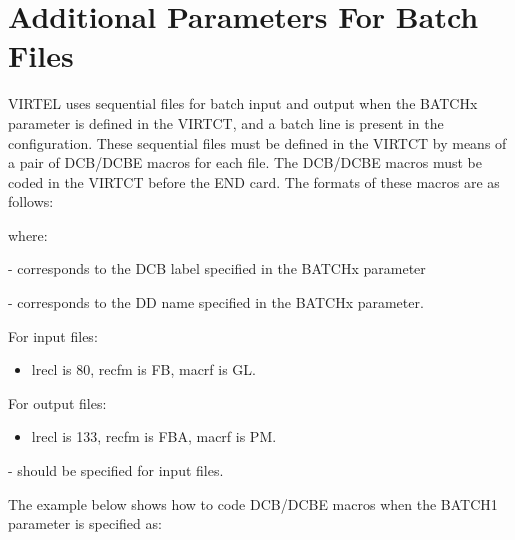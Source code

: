 \documentclass[letterpaper,10pt,english]{sphinxmanual}
\begin{document}
\section{Additional Parameters For Batch Files}
\label{\detokenize{Installation_Guide:additional-parameters-for-batch-files}}\label{\detokenize{Installation_Guide:index-144}}
VIRTEL uses sequential files for batch input and output when the BATCHx parameter is defined in the VIRTCT, and a batch line is present in the configuration. These sequential files must be defined in the VIRTCT by means of a pair of DCB/DCBE macros for each file. The DCB/DCBE macros must be coded in the VIRTCT before the END card. The formats of these macros are as follows:

\begin{sphinxVerbatim}[commandchars=\\\{\}]
                             
  
\end{sphinxVerbatim}

where:

 - corresponds to the DCB label specified in the BATCHx parameter

 - corresponds to the DD name specified in the BATCHx parameter.

For input files:
\begin{itemize}
\item {} 
lrecl is 80, recfm is FB, macrf is GL.

\end{itemize}

For output files:
\begin{itemize}
\item {} 
lrecl is 133, recfm is FBA, macrf is PM.

\end{itemize}

 - should be specified for input files.

The example below shows how to code DCB/DCBE macros when the BATCH1 parameter is specified as:
\end{document}
